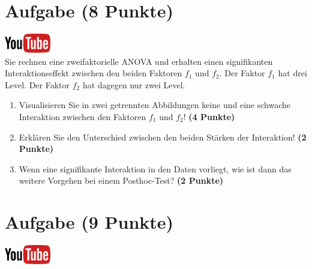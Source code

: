 \documentclass[a4paper, 9pt]{scrartcl}\usepackage[]{graphicx}\usepackage[]{xcolor}
\begin{document}
 
\clearpage

\section{Aufgabe \hfill (8 Punkte)}

\hfill\href{https://youtu.be/2qG1Dws0MJo}{\includegraphics[width =
  2cm]{img/youtube}}\\[1Ex]


Sie rechnen eine zweifaktorielle ANOVA und erhalten einen signifikanten
Interaktionseffekt zwischen den beiden Faktoren $f_1$ und $f_2$. Der Faktor
$f_1$ hat drei Level. Der Faktor $f_2$ hat dagegen nur zwei Level.




\begin{enumerate}
\item Visualisieren Sie in zwei getrennten Abbildungen 
  keine und eine schwache Interaktion zwischen
  den Faktoren $f_1$ und $f_2$! \textbf{(4 Punkte)}
\item Erkl{\"a}ren Sie den Unterschied zwischen den beiden St{\"a}rken der Interaktion!
  \textbf{(2 Punkte)}
\item Wenn eine signifikante Interaktion in den Daten vorliegt, wie ist
  dann das weitere Vorgehen bei einem Posthoc-Test? 
  \textbf{(2 Punkte)}
\end{enumerate}

 
\clearpage

\section{Aufgabe \hfill (9 Punkte)}

\hfill\href{https://youtu.be/M9Uhm67ndxM}{\includegraphics[width =
  2cm]{img/youtube}}\\[1Ex]
\end{document}
